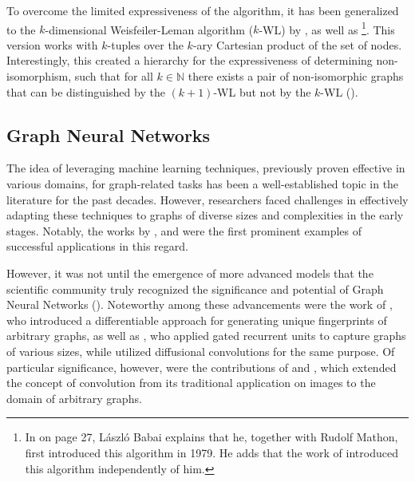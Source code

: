 To overcome the limited expressiveness of the \wl algorithm, it has been generalized to the $k$-dimensional Weisfeiler-Leman algorithm ($k$-WL) by \cite{Bab1979, Babai2016}, as well as \cite{Imm+1990}\footnote{In \cite{Babai2016} on page 27, László Babai explains that he, together with Rudolf Mathon, first introduced this algorithm in 1979. He adds that the work of \cite{Imm+1990} introduced this algorithm independently of him.}. This version works with $k$-tuples over the $k$-ary Cartesian product of the set of nodes. Interestingly, this created a hierarchy for the expressiveness of determining non-isomorphism, such that for all $k \in \mathbb{N}$ there exists a pair of non-isomorphic graphs that can be distinguished by the \textsf{$(k+1)$-WL} but not by the \textsf{$k$-WL} (\cite{Cai1992}).

\subsection{Graph Neural Networks}
The idea of leveraging machine learning techniques, previously proven effective in various domains, for graph-related tasks has been a well-established topic in the literature for the past decades. However, researchers faced challenges in effectively adapting these techniques to graphs of diverse sizes and complexities in the early stages. Notably, the works by \cite{Sperduti1997,Scarselli2008}, and \cite{Micheli2009} were the first prominent examples of successful applications in this regard.

However, it was not until the emergence of more advanced models that the scientific community truly recognized the significance and potential of \textsf{Graph Neural Networks} (\gnns). Noteworthy among these advancements were the work of \cite{Duvenaud2015}, who introduced a differentiable approach for generating unique fingerprints of arbitrary graphs, as well as \cite{Li2015}, who applied gated recurrent units to capture graphs of various sizes, while \cite{Atwood2016} utilized diffusional convolutions for the same purpose. Of particular significance, however, were the contributions of \cite{Bruna2013,Defferrard2016} and \cite{Kip+2017}, which extended the concept of convolution from its traditional application on images to the domain of arbitrary graphs.

